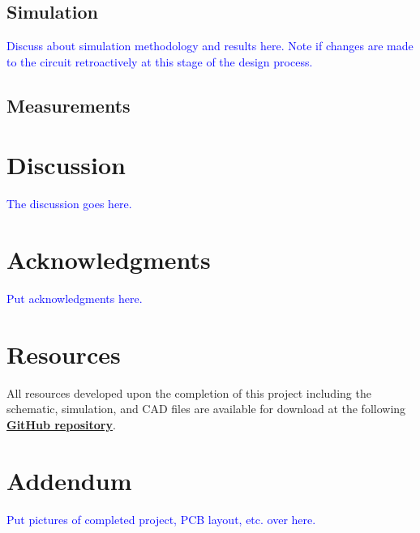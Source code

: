 \documentclass[10pt]{article}
\begin{document}
\begin{multicols*}{2}
            \subsection{Simulation}
                \textcolor{blue}{Discuss about simulation methodology and results here. Note if changes are made to the circuit retroactively at this stage of the design process.}

            \subsection{Measurements}
        
        \section{Discussion}
            \textcolor{blue}{The discussion goes here.}

        \section*{Acknowledgments}
            \textcolor{blue}{Put acknowledgments here. }

        \section*{Resources}
            All resources developed upon the completion of this project including the schematic, simulation, and CAD files are available for download at the following \textbf{\textcolor{github-butterfly-bush}{\href{https://github.com/ShaunG-RU/DRC-Project}{GitHub repository}}}.

        \printbibliography

    \end{multicols*}

    \newpage

    \section*{Addendum}
        \textcolor{blue}{Put pictures of completed project, PCB layout, etc. over here.}
\end{document}
